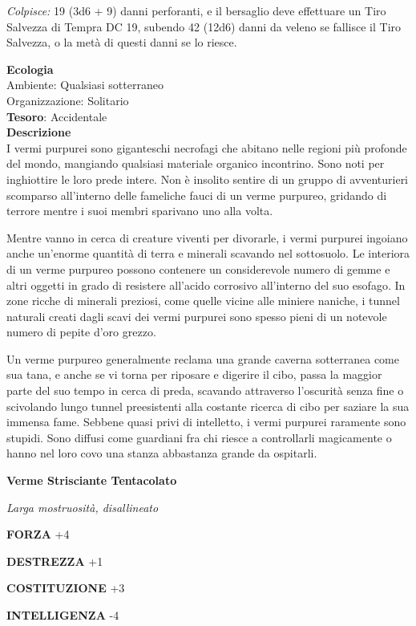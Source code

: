 \begin{multicols}{2}
	\textit{Colpisce:} 19 (3d6 + 9) danni perforanti, e il bersaglio deve effettuare un Tiro Salvezza di Tempra DC 19, subendo 42 (12d6) danni da veleno se fallisce il Tiro Salvezza, o la metà di questi danni se lo riesce.

	\textbf{Ecologia}\\
	Ambiente: Qualsiasi sotterraneo\\
	Organizzazione: Solitario\\
	\textbf{Tesoro}: Accidentale\\
	\textbf{Descrizione}\\
	I vermi purpurei sono giganteschi necrofagi che abitano nelle regioni più profonde del mondo, mangiando qualsiasi materiale organico incontrino. Sono noti per inghiottire le loro prede intere. Non è insolito sentire di un gruppo di avventurieri scomparso all'interno delle fameliche fauci di un verme purpureo, gridando di terrore mentre i suoi membri sparivano uno alla volta.

	Mentre vanno in cerca di creature viventi per divorarle, i vermi purpurei ingoiano anche un'enorme quantità di terra e minerali scavando nel sottosuolo. Le interiora di un verme purpureo possono contenere un considerevole numero di gemme e altri oggetti in grado di resistere all'acido corrosivo all'interno del suo esofago. In zone ricche di minerali preziosi, come quelle vicine alle miniere naniche, i tunnel naturali creati dagli scavi dei vermi purpurei sono spesso pieni di un notevole numero di pepite d'oro grezzo.

	Un verme purpureo generalmente reclama una grande caverna sotterranea come sua tana, e anche se vi torna per riposare e digerire il cibo, passa la maggior parte del suo tempo in cerca di preda, scavando attraverso l'oscurità senza fine o scivolando lungo tunnel preesistenti alla costante ricerca di cibo per saziare la sua immensa fame. Sebbene quasi privi di intelletto, i vermi purpurei raramente sono stupidi. Sono diffusi come guardiani fra chi riesce a controllarli magicamente o hanno nel loro covo una stanza abbastanza grande da ospitarli.


	\medskip{}\textbf{Verme Strisciante Tentacolato}

	\textit{Larga mostruosità, disallineato}

	\textbf{FORZA} +4

	\textbf{DESTREZZA} +1

	\textbf{COSTITUZIONE} +3

	\textbf{INTELLIGENZA} -4


\end{multicols}
